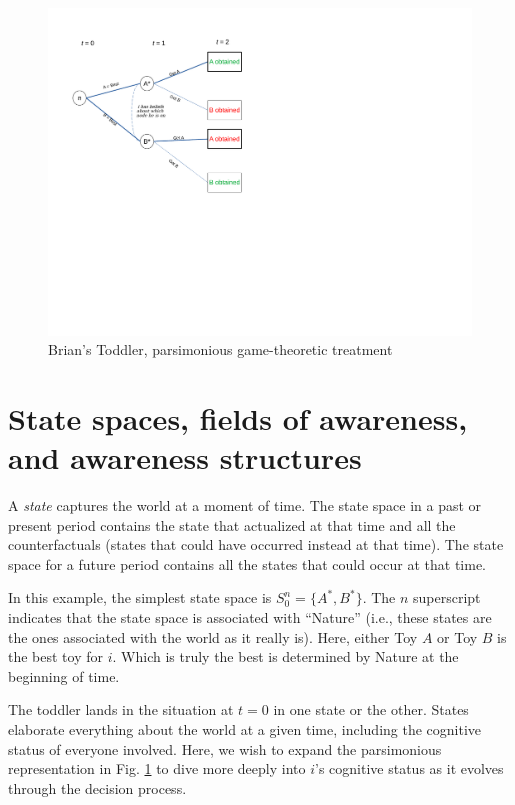 \documentclass[
11pt,
titlepage,
reqno,
]{article}%
\theoremstyle{definition}
\begin{document}
\begin{figure}[h!]
	\centering
	\includegraphics*[page=1,trim = 0 3.5in 5in 0in,scale = .8]{Awareness_Diagrams_All}
	\caption{Brian's Toddler, parsimonious game-theoretic treatment\label{Diag: p-01}}%
\end{figure}

\section*{State spaces, fields of awareness, and awareness structures}
A \textit{state} captures the world at a moment of time. The state space in a past or present period contains the state that actualized at that time and all the counterfactuals (states that could have occurred instead at that time). The state space for a future period contains all the states that could occur at that time. 

In this example, the simplest state space is $S^n_0=\{A^\ast,B^\ast\}$. The $n$ superscript indicates that the state space is associated with ``Nature'' (i.e., these states are the ones associated with the world as it really is). Here, either Toy $A$ or Toy $B$ is the best toy for $i$. Which is truly the best is determined by Nature at the beginning of time. 

The toddler lands in the situation at $t=0$ in one state or the other. States elaborate everything about the world at a given time, including the cognitive status of everyone involved. Here, we wish to expand the parsimonious representation in Fig. \ref{Diag: p-01} to dive more deeply into $i$'s cognitive status as it evolves through the decision process. 
\end{document}
